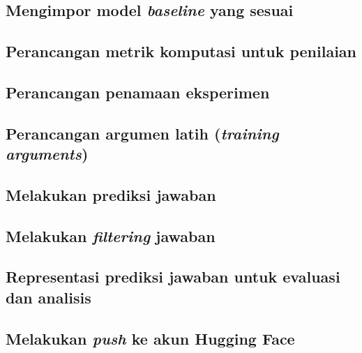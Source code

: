 \subsection{Mengimpor model \emph{baseline} yang sesuai}

\subsection{Perancangan metrik komputasi untuk penilaian}

\subsection{Perancangan penamaan eksperimen}

\subsection{Perancangan argumen latih (\emph{training arguments})}

\subsection{Melakukan prediksi jawaban}

\subsection{Melakukan \emph{filtering} jawaban}

\subsection{Representasi prediksi jawaban untuk evaluasi dan analisis}

\subsection{Melakukan \emph{push} ke akun Hugging Face}
